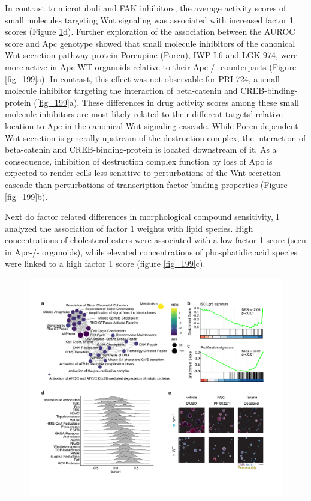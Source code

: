 \begin{flushleft}
In contrast to microtubuli and FAK inhibitors, the average activity scores of small molecules targeting Wnt signaling was associated with increased factor 1 scores (Figure \ref{fig_190}d). Further exploration of the association between the AUROC score and Apc genotype showed that small molecule inhibitors of the canonical Wnt secretion pathway protein Porcupine (Porcn), IWP-L6 and LGK-974, were more active in Apc WT organoids relative to their Apc-/- counterparts (Figure \ref{fig_199}a). In contrast, this effect was not observable for PRI-724, a small molecule inhibitor targeting the interaction of beta-catenin and CREB-binding-protein (\ref{fig_199}a). These differences in drug activity scores among these small molecule inhibitors are most likely related to their different targets' relative location to Apc in the canonical Wnt signaling cascade. While Porcn-dependent Wnt secretion is generally upstream of the destruction complex, the interaction of beta-catenin and CREB-binding-protein is located downstream of it. As a consequence, inhibition of destruction complex function by loss of Apc is expected to render cells less sensitive to perturbations of the Wnt secretion cascade than perturbations of transcription factor binding properties (Figure \ref{fig_199}b). 

Next do factor related differences in morphological compound sensitivity, I analyzed the association of factor 1 weights with lipid species. High concentrations of cholesterol esters were associated with a low factor 1 score (seen in Apc-/- organoids), while elevated concentrations of phosphatidic acid species were linked to a high factor 1 score (figure \ref{fig_199}c).

\begin{figure}[h]
\centering
\includegraphics[width=\textwidth,
                height=\textheight,
                keepaspectratio]{figures/adenomaprofiling/pdf/fig_2_1.pdf}
\caption{}
\label{fig_190}
\end{figure}
\bigbreak




\end{flushleft}
